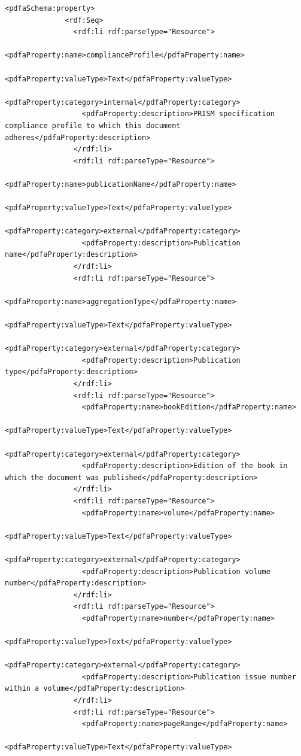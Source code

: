 \begin{lstlisting}[style=myXML,
caption={Second part of the XML metadata embedded in a PDF file (some reformatting has been done to fit the text in the boarders)}, label={lst:pdfinfoOutputPart2}]
            <pdfaSchema:property>
              <rdf:Seq>
                <rdf:li rdf:parseType="Resource">
                  <pdfaProperty:name>complianceProfile</pdfaProperty:name>
                  <pdfaProperty:valueType>Text</pdfaProperty:valueType>
                  <pdfaProperty:category>internal</pdfaProperty:category>
                  <pdfaProperty:description>PRISM specification compliance profile to which this document adheres</pdfaProperty:description>
                </rdf:li>
                <rdf:li rdf:parseType="Resource">
                  <pdfaProperty:name>publicationName</pdfaProperty:name>
                  <pdfaProperty:valueType>Text</pdfaProperty:valueType>
                  <pdfaProperty:category>external</pdfaProperty:category>
                  <pdfaProperty:description>Publication name</pdfaProperty:description>
                </rdf:li>
                <rdf:li rdf:parseType="Resource">
                  <pdfaProperty:name>aggregationType</pdfaProperty:name>
                  <pdfaProperty:valueType>Text</pdfaProperty:valueType>
                  <pdfaProperty:category>external</pdfaProperty:category>
                  <pdfaProperty:description>Publication type</pdfaProperty:description>
                </rdf:li>
                <rdf:li rdf:parseType="Resource">
                  <pdfaProperty:name>bookEdition</pdfaProperty:name>
                  <pdfaProperty:valueType>Text</pdfaProperty:valueType>
                  <pdfaProperty:category>external</pdfaProperty:category>
                  <pdfaProperty:description>Edition of the book in which the document was published</pdfaProperty:description>
                </rdf:li>
                <rdf:li rdf:parseType="Resource">
                  <pdfaProperty:name>volume</pdfaProperty:name>
                  <pdfaProperty:valueType>Text</pdfaProperty:valueType>
                  <pdfaProperty:category>external</pdfaProperty:category>
                  <pdfaProperty:description>Publication volume number</pdfaProperty:description>
                </rdf:li>
                <rdf:li rdf:parseType="Resource">
                  <pdfaProperty:name>number</pdfaProperty:name>
                  <pdfaProperty:valueType>Text</pdfaProperty:valueType>
                  <pdfaProperty:category>external</pdfaProperty:category>
                  <pdfaProperty:description>Publication issue number within a volume</pdfaProperty:description>
                </rdf:li>
                <rdf:li rdf:parseType="Resource">
                  <pdfaProperty:name>pageRange</pdfaProperty:name>
                  <pdfaProperty:valueType>Text</pdfaProperty:valueType>

\end{lstlisting}
